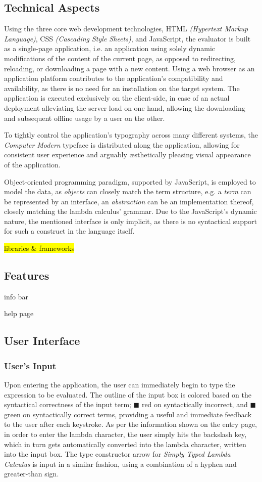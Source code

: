 \documentclass[a4paper,10pt]{article}
\begin{document}
\subsection{Technical Aspects}
Using the three core web development technologies,
HTML \textit{(Hypertext Markup Language)}, CSS \textit{(Cascading Style Sheets)}, and JavaScript,
the evaluator is built as a single-page application,
i.e. an application using solely dynamic modifications of the content of the current page,
as opposed to redirecting, reloading, or downloading a page with a new content.
Using a web browser as an application platform contributes
to the application's compatibility and availability, 
as there is no need for an installation on the target system.
The application is executed exclusively on the client-side,
in case of an actual deployment alleviating the server load on one hand,
allowing the downloading and subsequent offline usage by a user on the other.

To tightly control the application's typography across many different systems,
the \textit{Computer Modern} typeface is distributed along the application, allowing
for consistent user experience and arguably {\ae}sthetically pleasing visual appearance of the application.

Object-oriented programming paradigm, supported by JavaScript, is employed
to model the data, as \textit{objects} can closely match the term structure,
e.g. a \textit{term} can be represented by an interface, an \textit{abstraction} can
be an implementation thereof, closely matching the lambda calculus' grammar.
Due to the JavaScript's dynamic nature, the mentioned interface is only implicit,
as there is no syntactical support for such a construct in the language itself.

\hl{libraries \& frameworks}

\subsection{Features}
info bar

help page

\subsection{User Interface}
\subsubsection{User's Input}
Upon entering the application, the user can immediately begin to type the expression
to be evaluated. The outline of the input box is colored based on the syntactical
correctness of the input term; {\color{synbad}$\blacksquare$} red on syntactically incorrect,
and {\color{syngood}$\blacksquare$} green on
syntactically correct terms, providing a useful and immediate feedback to the user after
each keystroke. As per the information shown on the entry page, in order to
enter the lambda character, the user simply hits the backslash key, which in turn
gets automatically converted into the lambda character, written into the input box.
The type constructor arrow for \textit{Simply Typed Lambda Calculus} is input
in a similar fashion, using a combination of a hyphen and greater-than sign.
\end{document}
